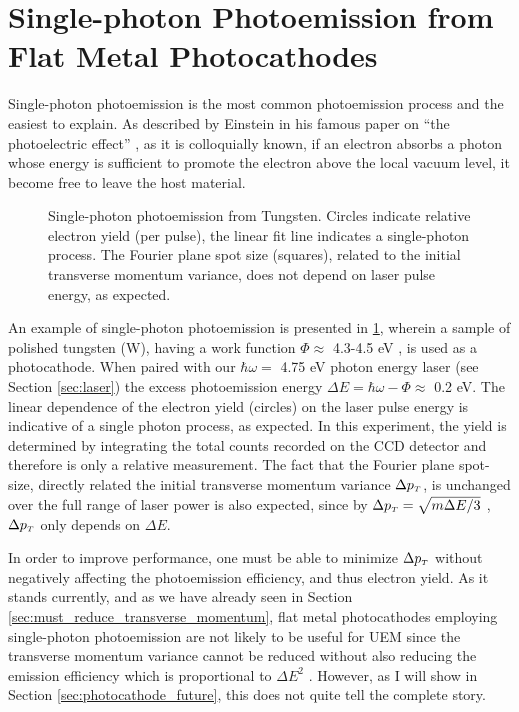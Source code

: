 
\section{Single-photon Photoemission from Flat Metal Photocathodes}

Single-photon photoemission is the most common photoemission process and the easiest to explain.
As described by Einstein in his famous paper on ``the photoelectric effect'' \cite{einstein_uber_1905}, as it is colloquially known, if an electron absorbs a photon whose energy is sufficient to promote the electron above the local vacuum level, it become free to leave the host material.

\begin{figure}
  \centering
  
  \caption[Single-photon photoemission from Tungsten]{
    Single-photon photoemission from Tungsten.
    Circles indicate relative electron yield (per pulse), the linear fit line indicates a single-photon process.
    The Fourier plane spot size (squares), related to the initial transverse momentum variance, does not depend on laser pulse energy, as expected.
  }
  \label{fig:single_photon_tungsten}
\end{figure}

An example of single-photon photoemission is presented in \ref{fig:single_photon_tungsten}, wherein a sample of polished tungsten (W), having a work function $\Phi \approx $ 4.3-4.5 eV \cite{yen_thermally_1980}, is used as a photocathode.
When paired with our $\hbar \omega = $ 4.75 eV photon energy laser (see Section \ref{sec:laser}) the excess photoemission energy $\Delta E = \hbar \omega - \Phi \approx $ 0.2 eV.
The linear dependence of the electron yield (circles) on the laser pulse energy is indicative of a single photon process, as expected.
In this experiment, the yield is determined by integrating the total counts recorded on the CCD detector and therefore is only a relative measurement.
The fact that the Fourier plane spot-size, directly related the initial transverse momentum variance $\Delta p_{{\scriptscriptstyle T}}$, is unchanged over the full range of laser power is also expected, since by $\Delta p_{{\scriptscriptstyle T}} = \sqrt{ m \Delta E / 3 } $ \cite{dowell_quantum_2009}, $\Delta p_{{\scriptscriptstyle T}}$ only depends on $\Delta E$.

In order to improve performance, one must be able to minimize $\Delta p_{{\scriptscriptstyle T}}$ without negatively affecting the photoemission efficiency, and thus electron yield.
As it stands currently, and as we have already seen in Section \ref{sec:must_reduce_transverse_momentum}, flat metal photocathodes employing single-photon photoemission are not likely to be useful for UEM since the transverse momentum variance cannot be reduced without also reducing the emission efficiency which is proportional to $\Delta E^2$ \cite{shalaev_electron_1994}.
However, as I will show in Section \ref{sec:photocathode_future}, this does not quite tell the complete story.

